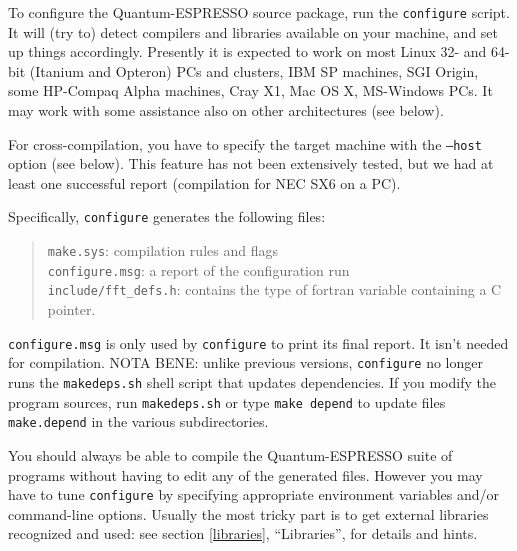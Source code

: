 \documentclass[12pt,a4paper]{article}
\begin{document}
To configure the Quantum-ESPRESSO source package, run the \texttt{configure}
script.  It will (try to) detect compilers and libraries available on
your machine, and set up things accordingly.
Presently it is expected to work on most Linux 32- and 64-bit (Itanium
and Opteron) PCs and clusters, IBM SP machines, SGI Origin, some
HP-Compaq Alpha machines, Cray X1, Mac OS X, MS-Windows PCs. 
It may work with 
some assistance also on other architectures (see below).

For cross-compilation, you have to specify the target machine with the
\texttt{--host} option (see below).  This feature has not been 
extensively tested, but we had at least one successful report 
(compilation for NEC SX6 on a PC).

Specifically, \texttt{configure} generates the following files: 
\begin{quote}
  \texttt{make.sys}: compilation rules and flags\\
  \texttt{configure.msg}: a report of the configuration run\\
  \texttt{include/fft\_defs.h}: contains the type of fortran variable
     containing a C pointer.
\end{quote}

\texttt{configure.msg} is only used by \texttt{configure} to print its
final report.  It isn't needed for compilation.
NOTA BENE: unlike previous versions, \texttt{configure} no longer 
runs the \texttt{makedeps.sh} shell script that updates dependencies.
If you modify the program sources, run \texttt{makedeps.sh} or type 
\texttt{make depend} to update files \texttt{make.depend} in the various 
subdirectories.

You should always be able to compile the Quantum-ESPRESSO suite of programs
without having to edit any of the generated files.  However you may
have to tune \texttt{configure} by specifying appropriate environment
variables and/or command-line options.
Usually the most tricky part is to get external libraries recognized
and used: see section \ref{libraries}, ``Libraries'', for details and
hints.
\end{document}
